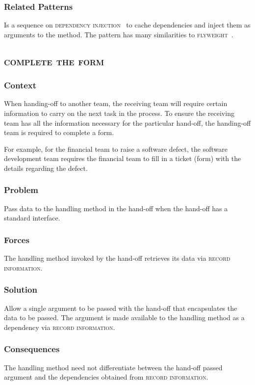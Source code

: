 \documentclass[prodmode]{style/acmlarge}
\begin{document}
\subsubsection*{Related Patterns} Is a sequence on \textsc{dependency
injection}~\cite{ioc} to cache dependencies and inject them as arguments to the
method.  The pattern has many similarities to \textsc{flyweight}~\cite{gof}.



\subsection{\textsc{\textbf{complete the form}}}

\subsubsection*{Context} When handing-off to another team, the receiving team
will require certain information to carry on the next task in the process.  To
ensure the receiving team has all the information necessary for the particular
hand-off, the handing-off team is required to complete a form.

For example, for the financial team to raise a software defect, the software
development team requires the financial team to fill in a ticket (form) with the
details regarding the defect.

\subsubsection*{Problem} Pass data to the handling method in the hand-off when
the hand-off has a standard interface.

\subsubsection*{Forces} The handling method invoked by the hand-off retrieves
its data via \textsc{record information}.

\subsubsection*{Solution} Allow a single argument to be passed with the hand-off
that encapsulates the data to be passed.  The argument is made available to the
handling method as a dependency via \textsc{record information}.

\subsubsection*{Consequences} The handling method need not differentiate between
the hand-off passed argument and the dependencies obtained from \textsc{record
information}.
\end{document}
